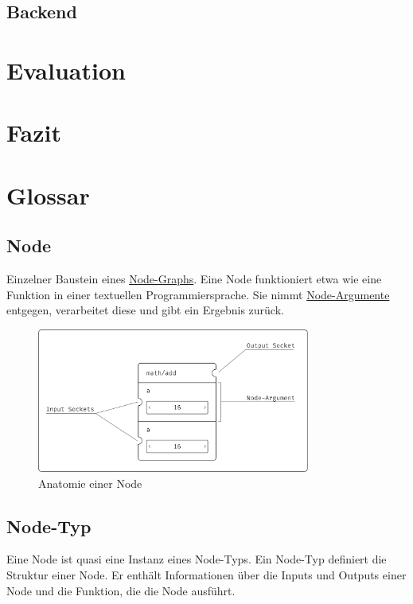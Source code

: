\documentclass[ngerman]{article}
\begin{document}
\subsection{Backend}

\section{Evaluation}
\section{Fazit}

\pagebreak
\section{Glossar}

\subsection{Node}
\label{sec:Node}
Einzelner Baustein eines \hyperref[sec:Node-Graph]{Node-Graphs}. Eine Node funktioniert etwa wie eine Funktion in einer textuellen Programmiersprache. Sie nimmt \hyperref[sec:Node-Argumente]{Node-Argumente} entgegen, verarbeitet diese und gibt ein Ergebnis zurück. 

\begin{figure}[htbp]
    \centering
    \includegraphics[width=0.8\textwidth]{graphics/NODE_ANATOMY.pdf}
    \caption{Anatomie einer Node}
    \label{sec:NODE_ANATOMY}
\end{figure}

\subsection{Node-Typ}
\label{sec:Node-Typ}
Eine Node ist quasi eine Instanz eines Node-Typs. Ein Node-Typ definiert die Struktur einer Node. Er enthält Informationen über die Inputs und Outputs einer Node und die Funktion, die die Node ausführt.
\end{document}
